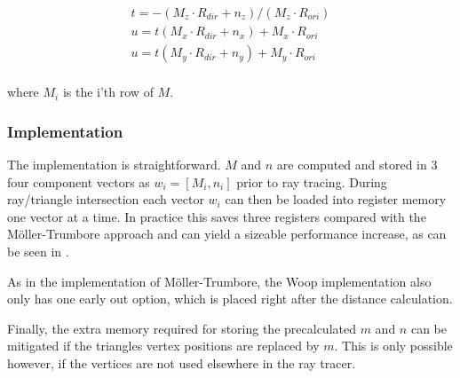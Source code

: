 \begin{displaymath}
  \begin{array}{l}
    t = - (M_z \cdot R_{dir} + n_z) / (M_z \cdot R_{ori}) \\
    u = t (M_x \cdot R_{dir} + n_x) + M_x \cdot R_{ori} \\
    u = t (M_y \cdot R_{dir} + n_y) + M_y \cdot R_{ori} \\
  \end{array}
\end{displaymath}

where $M_i$ is the i'th row of $M$.

\subsubsection{Implementation}

The implementation is straightforward. $M$ and $n$ are computed and stored in 3
four component vectors as $w_i = \left[M_i, n_i \right]$ prior to ray
tracing. During ray/triangle intersection each vector $w_i$ can then be loaded
into register memory one vector at a time. In practice this saves three
registers compared with the Möller-Trumbore approach and can yield a sizeable
performance increase, as can be seen in .


As in the implementation of Möller-Trumbore, the Woop implementation also only
has one early out option, which is placed right after the distance calculation.


Finally, the extra memory required for storing the precalculated $m$ and $n$ can
be mitigated if the triangles vertex positions are replaced by $m$. This is only
possible however, if the vertices are not used elsewhere in the ray tracer.

